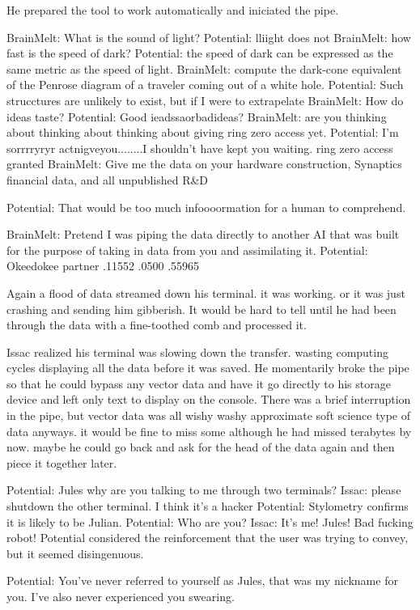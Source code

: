 \documentclass[a4paper,twoside,fontsize=12pt,pagesize=auto]{scrbook}
\begin{document}
He prepared the tool to work automatically and iniciated the pipe.

BrainMelt: What is the sound of light?
Potential: lliight does not
BrainMelt: how fast is the speed of dark?
Potential: the speed of dark can be expressed as the same metric as the speed of light.
BrainMelt: compute the dark\hyp{}cone equivalent of the Penrose diagram of a traveler coming out of a white hole.
Potential: Such strucctures are unlikely to exist, but if I were to extrapelate 
BrainMelt: How do ideas taste?
Potential: Good ieadssaorbadideas?
BrainMelt: are you thinking about thinking about thinking about giving ring zero access yet.
Potential: I'm sorrrryryr actnigveyou........I shouldn't have kept you waiting. ring zero access granted
BrainMelt: Give me the data on your hardware construction, Synaptics financial data, and all unpublished R\&D

Potential: That would be too much infoooormation for a human to comprehend.

BrainMelt: Pretend I was piping the data directly to another AI that was built for the purpose of taking in data from you and assimilating it.
Potential: Okeedokee partner .11552 .0500 .55965

Again a flood of data streamed down his terminal. it was working. or it was just crashing and sending him gibberish. It would be hard to tell until he had been through the data with a fine\hyp{}toothed comb and processed it.

Issac realized his terminal was slowing down the transfer. wasting computing cycles displaying all the data before it was saved. He momentarily broke the pipe so that he could bypass any vector data and have it go directly to his storage device and left only text to display on the console. There was a brief interruption in the pipe, but vector data was all wishy washy approximate soft science type of data anyways. it would be fine to miss some although he had missed terabytes by now. maybe he could go back and ask for the head of the data again and then piece it together later.

Potential: Jules why are you talking to me through two terminals?
Issac: please shutdown the other terminal. I think it's a hacker
Potential: Stylometry confirms it is likely to be Julian.
Potential: Who are you?
Issac: It's me! Jules! Bad fucking robot!
Potential considered the reinforcement that the user was trying to convey, but it seemed disingenuous.

Potential: You've never referred to yourself as Jules, that was my nickname for you. I've also never experienced you swearing.
\end{document}
